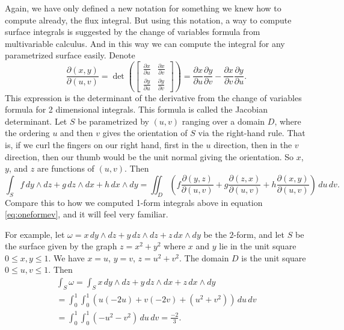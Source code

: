\documentclass[12pt]{article}
\begin{document}
Again, we have only defined a new notation for something we knew how
to compute already,
the flux integral.  But using this notation,
a way to compute surface integrals is suggested by the change of
variables formula from multivariable calculus.  And in this way we can
compute the integral for any parametrized surface easily.
Denote
\[
\frac{\partial (x,y)}{\partial (u,v)}
=
\det \left(
\begin{bmatrix}
\frac{\partial x}{\partial u}
&
\frac{\partial x}{\partial v}
\\[3pt]
\frac{\partial y}{\partial u} 
&
\frac{\partial y}{\partial v}
\end{bmatrix}
\right)
=
\frac{\partial x}{\partial u}
\frac{\partial y}{\partial v}
-
\frac{\partial x}{\partial v}
\frac{\partial y}{\partial u} .
\]
This expression is the determinant of the derivative from the
change of variables formula for 2 dimensional integrals.
This formula is called the Jacobian determinant.
Let $S$ be parametrized by $(u,v)$ ranging over a domain $D$,
where the ordering $u$ and then $v$
gives the orientation of $S$ via the right-hand rule.
That is, if we curl the fingers on our right hand, first in the $u$ direction,
then in the $v$ direction,
then our thumb would be the unit normal giving the orientation.
So $x$, $y$, and $z$ are functions of $(u,v)$.
Then
\begin{equation*}
\int_S
f\, dy \wedge dz + 
g\, dz \wedge dx +
h\, dx \wedge dy
=
\iint_D
\left(
f 
\frac{\partial (y,z)}{\partial (u,v)}
+
g
\frac{\partial (z,x)}{\partial (u,v)}
+
h
\frac{\partial (x,y)}{\partial (u,v)}
\right)
\,
du\, dv .
\end{equation*}
Compare this to how we computed 1-form integrals above in
equation \eqref{eq:oneformev}, and it will feel very familiar.

For example, let $\omega = x \, dy \wedge dz + y \, dz \wedge dz
+ z \, dx \wedge dy$ be the
$2$-form, and let
$S$ be the surface given by the graph $z=x^2+y^2$ where $x$ and $y$ lie in
the unit square $0 \leq x,y \leq 1$.  We have $x=u$, $y=v$, $z=u^2+v^2$.
The domain $D$ is the unit square $0 \leq u,v \leq 1$.  Then
\begin{multline*}
\int_S \omega =
\int_S
x\, dy \wedge dz + 
y\, dz \wedge dx +
z\, dx \wedge dy
\\
=
\int_0^1 \int_0^1
\left(
u 
(-2u)
+
v
(-2v)
+
(u^2+v^2)
\right)
\,
du\, dv 
\\
=
\int_0^1 \int_0^1
(-u^2-v^2)
\,
du\, dv 
=
\frac{-2}{3} .
\end{multline*}
\end{document}
